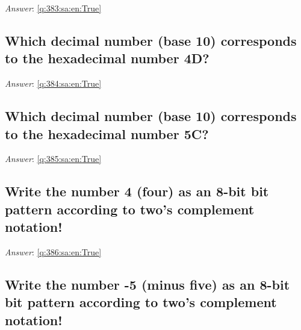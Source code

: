 \documentclass[a4paper,11pt,oneside]{article}
\begin{document}
\begin{sloppypar}
\textit{Answer}: \autoref{q:383:sa:en:True}



\subsection{Which decimal number (base 10) corresponds to the hexadecimal number 4D?}

\label{q:384:sa:en:False}

\vspace{2cm}

\noindent\makebox[\textwidth]{\hrulefill}

\vspace{1cm}

\textit{Answer}: \autoref{q:384:sa:en:True}



\subsection{Which decimal number (base 10) corresponds to the hexadecimal number 5C?}

\label{q:385:sa:en:False}

\vspace{2cm}

\noindent\makebox[\textwidth]{\hrulefill}

\vspace{1cm}

\textit{Answer}: \autoref{q:385:sa:en:True}



\subsection{Write the number 4 (four) as an 8-bit bit pattern according to two's complement notation!}

\label{q:386:sa:en:False}

\vspace{2cm}

\noindent\makebox[\textwidth]{\hrulefill}

\vspace{1cm}

\textit{Answer}: \autoref{q:386:sa:en:True}



\subsection{Write the number -5 (minus five) as an 8-bit bit pattern according to two's complement notation!}


\end{sloppypar}
\end{document}
